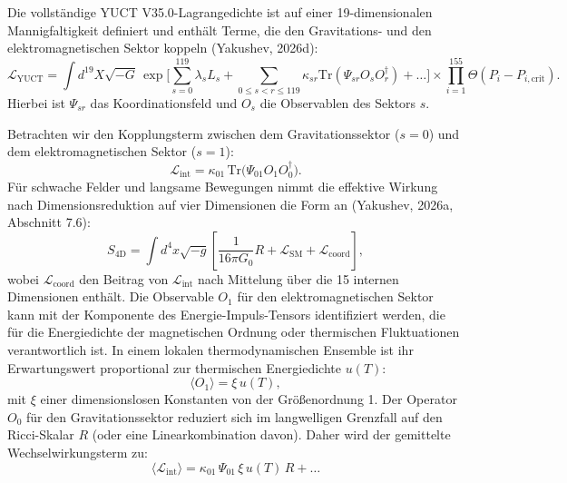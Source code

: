 \documentclass[12pt]{article}
\theoremstyle{remark}
\newcommand{\lagr}{\mathcal{L}}
\begin{document}
	Die vollständige YUCT V35.0-Lagrangedichte ist auf einer 19-dimensionalen Mannigfaltigkeit definiert und enthält Terme, die den Gravitations- und den elektromagnetischen Sektor koppeln (Yakushev, 2026d):
	\begin{equation}
		\lagr_{\text{YUCT}} = \int d^{19}X \sqrt{-G} \, 
		\exp\Bigg[ \sum_{s=0}^{119} \lambda_s L_s + \sum_{0\le s<r\le119} \kappa_{sr} \mathrm{Tr}(\Psi_{sr} O_s O_r^\dagger) + \dots \Bigg]
		\times \prod_{i=1}^{155} \Theta(P_i - P_{i,\text{crit}}).
		\label{eq:lagrangian-full}
	\end{equation}
	Hierbei ist $\Psi_{sr}$ das Koordinationsfeld und $O_s$ die Observablen des Sektors $s$.
	
	Betrachten wir den Kopplungsterm zwischen dem Gravitationssektor ($s=0$) und dem elektromagnetischen Sektor ($s=1$):
	\begin{equation}
		\lagr_{\text{int}} = \kappa_{01} \, \mathrm{Tr}\big(\Psi_{01} O_1 O_0^\dagger\big).
	\end{equation}
	Für schwache Felder und langsame Bewegungen nimmt die effektive Wirkung nach Dimensionsreduktion auf vier Dimensionen die Form an (Yakushev, 2026a, Abschnitt 7.6):
	\begin{equation}
		S_{\text{4D}} = \int d^4x \sqrt{-g} \left[ \frac{1}{16\pi G_0} R + \mathcal{L}_{\text{SM}} + \mathcal{L}_{\text{coord}} \right],
	\end{equation}
	wobei $\mathcal{L}_{\text{coord}}$ den Beitrag von $\lagr_{\text{int}}$ nach Mittelung über die 15 internen Dimensionen enthält. Die Observable $O_1$ für den elektromagnetischen Sektor kann mit der Komponente des Energie-Impuls-Tensors identifiziert werden, die für die Energiedichte der magnetischen Ordnung oder thermischen Fluktuationen verantwortlich ist. In einem lokalen thermodynamischen Ensemble ist ihr Erwartungswert proportional zur thermischen Energiedichte $u(T)$:
	\begin{equation}
		\langle O_1 \rangle = \xi \, u(T),
	\end{equation}
	mit $\xi$ einer dimensionslosen Konstanten von der Größenordnung 1. Der Operator $O_0$ für den Gravitationssektor reduziert sich im langwelligen Grenzfall auf den Ricci-Skalar $R$ (oder eine Linearkombination davon). Daher wird der gemittelte Wechselwirkungsterm zu:
	\begin{equation}
		\langle \lagr_{\text{int}} \rangle = \kappa_{01} \, \Psi_{01} \, \xi \, u(T) \, R + \dots
	\end{equation}
\end{document}
